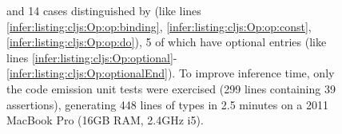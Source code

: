 \begin{figure}
{         and 14 cases distinguished by  (like lines \ref{infer:listing:cljs:Op:op:binding},
         \ref{infer:listing:cljs:Op:op:const}, \ref{infer:listing:cljs:Op:op:do}),
         5 of which have optional entries (like lines \ref{infer:listing:cljs:Op:optional}-\ref{infer:listing:cljs:Op:optionalEnd}).
         To improve inference time,
         only the code emission unit tests were exercised (299 lines containing 39 assertions),
         generating 448 lines of types %
         in 2.5 minutes on a 2011 MacBook Pro (16GB RAM, 2.4GHz i5).
}
\label{infer:fig:cljs}

\end{figure}

